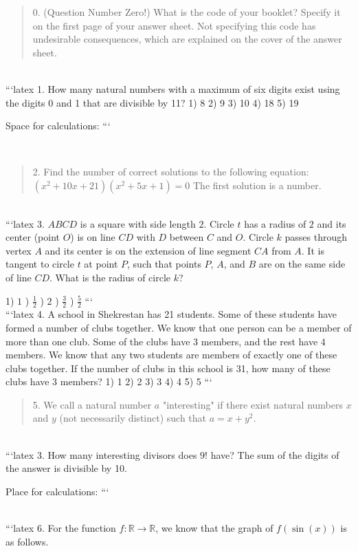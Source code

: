 \begin{quote}
0. (Question Number Zero!) What is the code of your booklet? Specify it on the first page of your answer sheet. Not specifying this code has undesirable consequences, which are explained on the cover of the answer sheet.
\end{quote}
\\
```latex
1. How many natural numbers with a maximum of six digits exist using the digits 0 and 1 that are divisible by 11? 
1) 8  2) 9  3) 10  4) 18  5) 19  

Space for calculations:  
```

\\
\begin{quote}
2. Find the number of correct solutions to the following equation:  
$ (x^2 + 10x + 21)(x^2 + 5x + 1) = 0 $  
The first solution is a number.
\end{quote}
\\
```latex
3. $ABCD$ is a square with side length $2$. Circle $t$ has a radius of $2$ and its center (point $O$) is on line $CD$ with $D$ between $C$ and $O$. Circle $k$ passes through vertex $A$ and its center is on the extension of line segment $CA$ from $A$. It is tangent to circle $t$ at point $P$, such that points $P$, $A$, and $B$ are on the same side of line $CD$. What is the radius of circle $k$?

1) $1$ ) $\frac{1}{2}$ ) $2$ ) $\frac{3}{2}$ ) $\frac{5}{2}$
```
\\
```latex
4. A school in Shekrestan has 21 students. Some of these students have formed a number of clubs together. We know that one person can be a member of more than one club. Some of the clubs have 3 members, and the rest have 4 members. We know that any two students are members of exactly one of these clubs together. If the number of clubs in this school is 31, how many of these clubs have 3 members? 
1) 1  2) 2  3) 3  4) 4  5) 5
```
\\
\begin{quote}
5. We call a natural number $a$ "interesting" if there exist natural numbers $x$ and $y$ (not necessarily distinct) such that $a = x + y^2$.
\end{quote}
\\
```latex
3. How many interesting divisors does $9!$ have? 
The sum of the digits of the answer is divisible by 10. 

Place for calculations: 
```

\\
```latex
6. For the function $f: \mathbb{R} \to \mathbb{R}$, we know that the graph of $f(\sin(x))$ is as follows.

